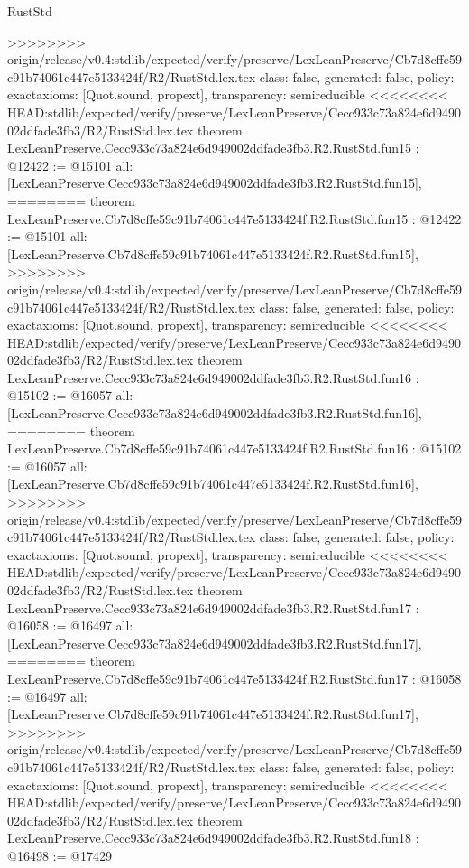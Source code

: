 \begin{lexlean}{RustStd}
\begin{coremodule}
{\begin{coremodule}
{{{{{{{{{{{{{{{{{{>>>>>>>> origin/release/v0.4:stdlib/expected/verify/preserve/LexLeanPreserve/Cb7d8cffe59c91b74061c447e5133424f/R2/RustStd.lex.tex
  class: false,
  generated: false,
  policy: exact{axioms: [Quot.sound, propext]},
  transparency: semireducible
}
<<<<<<<< HEAD:stdlib/expected/verify/preserve/LexLeanPreserve/Cecc933c73a824e6d949002ddfade3fb3/R2/RustStd.lex.tex
theorem LexLeanPreserve.Cecc933c73a824e6d949002ddfade3fb3.R2.RustStd.fun15 : @12422 := @15101 {
  all: [LexLeanPreserve.Cecc933c73a824e6d949002ddfade3fb3.R2.RustStd.fun15],
========
theorem LexLeanPreserve.Cb7d8cffe59c91b74061c447e5133424f.R2.RustStd.fun15 : @12422 := @15101 {
  all: [LexLeanPreserve.Cb7d8cffe59c91b74061c447e5133424f.R2.RustStd.fun15],
>>>>>>>> origin/release/v0.4:stdlib/expected/verify/preserve/LexLeanPreserve/Cb7d8cffe59c91b74061c447e5133424f/R2/RustStd.lex.tex
  class: false,
  generated: false,
  policy: exact{axioms: [Quot.sound, propext]},
  transparency: semireducible
}
<<<<<<<< HEAD:stdlib/expected/verify/preserve/LexLeanPreserve/Cecc933c73a824e6d949002ddfade3fb3/R2/RustStd.lex.tex
theorem LexLeanPreserve.Cecc933c73a824e6d949002ddfade3fb3.R2.RustStd.fun16 : @15102 := @16057 {
  all: [LexLeanPreserve.Cecc933c73a824e6d949002ddfade3fb3.R2.RustStd.fun16],
========
theorem LexLeanPreserve.Cb7d8cffe59c91b74061c447e5133424f.R2.RustStd.fun16 : @15102 := @16057 {
  all: [LexLeanPreserve.Cb7d8cffe59c91b74061c447e5133424f.R2.RustStd.fun16],
>>>>>>>> origin/release/v0.4:stdlib/expected/verify/preserve/LexLeanPreserve/Cb7d8cffe59c91b74061c447e5133424f/R2/RustStd.lex.tex
  class: false,
  generated: false,
  policy: exact{axioms: [Quot.sound, propext]},
  transparency: semireducible
}
<<<<<<<< HEAD:stdlib/expected/verify/preserve/LexLeanPreserve/Cecc933c73a824e6d949002ddfade3fb3/R2/RustStd.lex.tex
theorem LexLeanPreserve.Cecc933c73a824e6d949002ddfade3fb3.R2.RustStd.fun17 : @16058 := @16497 {
  all: [LexLeanPreserve.Cecc933c73a824e6d949002ddfade3fb3.R2.RustStd.fun17],
========
theorem LexLeanPreserve.Cb7d8cffe59c91b74061c447e5133424f.R2.RustStd.fun17 : @16058 := @16497 {
  all: [LexLeanPreserve.Cb7d8cffe59c91b74061c447e5133424f.R2.RustStd.fun17],
>>>>>>>> origin/release/v0.4:stdlib/expected/verify/preserve/LexLeanPreserve/Cb7d8cffe59c91b74061c447e5133424f/R2/RustStd.lex.tex
  class: false,
  generated: false,
  policy: exact{axioms: [Quot.sound, propext]},
  transparency: semireducible
}
<<<<<<<< HEAD:stdlib/expected/verify/preserve/LexLeanPreserve/Cecc933c73a824e6d949002ddfade3fb3/R2/RustStd.lex.tex
theorem LexLeanPreserve.Cecc933c73a824e6d949002ddfade3fb3.R2.RustStd.fun18 : @16498 := @17429 {
}}}}}}}}}}}}}}}}}}}}}
\end{coremodule}}
\end{coremodule}
\end{lexlean}
